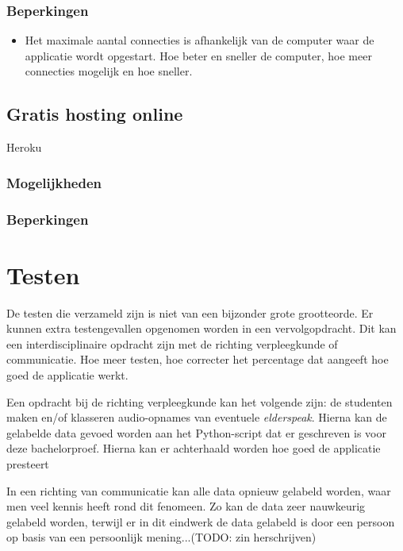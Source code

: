 \subsubsection{Beperkingen}
\begin{itemize}
    \item Het maximale aantal connecties is afhankelijk van de computer waar de applicatie wordt opgestart. Hoe beter en sneller de computer, hoe meer connecties mogelijk en hoe sneller.
\end{itemize}

\subsection{Gratis hosting online}
Heroku
\subsubsection{Mogelijkheden}
\subsubsection{Beperkingen}

\section{Testen}
De testen die verzameld zijn is niet van een bijzonder grote grootteorde. Er kunnen extra testengevallen opgenomen worden in een vervolgopdracht. Dit kan een interdisciplinaire opdracht zijn met de richting verpleegkunde of communicatie. Hoe meer testen, hoe correcter het percentage dat aangeeft hoe goed de applicatie werkt.

Een opdracht bij de richting verpleegkunde kan het volgende zijn: de studenten maken en/of klasseren audio-opnames van eventuele \textit{elderspeak}. Hierna kan de gelabelde data gevoed worden aan het Python-script dat er geschreven is voor deze bachelorproef. Hierna kan er achterhaald worden hoe goed de applicatie presteert

In een richting van communicatie kan alle data opnieuw gelabeld worden, waar men veel kennis heeft rond dit fenomeen. Zo kan de data zeer nauwkeurig gelabeld worden, terwijl er in dit eindwerk de data gelabeld is door een persoon op basis van een persoonlijk mening...(TODO: zin herschrijven)
